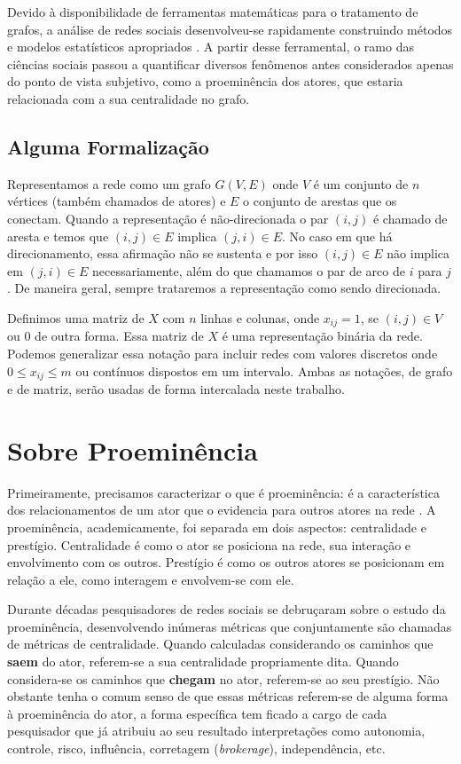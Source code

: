 \documentclass{article}
\begin{document}
Devido à disponibilidade de ferramentas matemáticas para o tratamento de grafos,
a análise de redes sociais desenvolveu-se rapidamente construindo métodos e
modelos estatísticos apropriados \cite{Butts2009}. A partir desse ferramental, o
ramo das ciências sociais passou a quantificar diversos fenômenos antes
considerados apenas do ponto de vista subjetivo, como a proeminência dos atores,
que estaria relacionada com a sua centralidade no grafo.

\subsection{Alguma Formalização}

Representamos a rede como um grafo $G(V,E)$ onde $V$ é um conjunto de $n$
vértices (também chamados de atores) e $E$ o conjunto de arestas que os conectam.
Quando a representação é não-direcionada o par $(i,j)$ é chamado de aresta e
temos que $(i,j) \in E$ implica $(j,i) \in E$. No caso em que há direcionamento,
essa afirmação não se sustenta e por isso $(i,j) \in E$ não implica em $(j,i) \in
E$ necessariamente, além do que chamamos o par de arco de $i$ para $j$. De
maneira geral, sempre trataremos a representação como sendo direcionada.

Definimos uma matriz de $X$ com $n$ linhas e colunas, onde $x_{ij} = 1$, se
$(i,j) \in V$ ou 0 de outra forma. Essa matriz de $X$ é uma representação
binária da rede. Podemos generalizar essa notação para incluir redes com valores
discretos onde $0 \leq x_{ij} \leq m$ ou contínuos dispostos em um intervalo.
Ambas as notações, de grafo e de matriz, serão usadas de forma intercalada neste
trabalho.

\section{Sobre Proeminência}

Primeiramente, precisamos caracterizar o que é proeminência: é a característica
dos relacionamentos de um ator que o evidencia para outros atores na rede
\cite{Wasserman}. A proeminência, academicamente, foi separada em dois aspectos:
centralidade e prestígio. Centralidade é como o ator se posiciona na rede, sua
interação e envolvimento com os outros. Prestígio é como os outros atores se
posicionam em relação a ele, como interagem e envolvem-se com ele.

Durante décadas pesquisadores de redes sociais se debruçaram sobre o estudo da
proeminência, desenvolvendo inúmeras métricas que conjuntamente são chamadas de
métricas de centralidade. Quando calculadas considerando os caminhos que
\textbf{saem} do ator, referem-se a sua centralidade propriamente dita. Quando
considera-se os caminhos que \textbf{chegam} no ator, referem-se ao seu
prestígio. Não obstante tenha o comum senso de que essas métricas referem-se de
alguma forma à proeminência do ator, a forma específica tem ficado a cargo de
cada pesquisador que já atribuiu ao seu resultado interpretações como autonomia,
controle, risco, influência, corretagem (\textit{brokerage}), independência,
etc.
\end{document}
